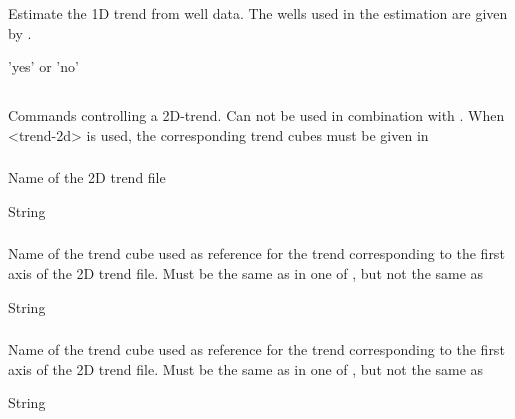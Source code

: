 {\subsubsection{}
 \slist
   \item \Description Estimate the 1D trend from well data. The wells used in the estimation are given by .
   \item \Argument 'yes' or 'no'
   \item \Default 
 \elist

\subsection{}
 \slist
   \item \Description Commands controlling a 2D-trend. Can not be used in combination with .  When <trend-2d> is used, the corresponding trend cubes must be given in 
   \item \Argument
   \item \Default 
 \elist

\subsubsection{}
 \slist
   \item \Description Name of the 2D trend file
   \item \Argument String
   \item \Default 
 \elist

\subsubsection{}
 \slist
   \item \Description Name of the trend cube used as reference for the trend corresponding to the first axis of the 2D trend file. Must be the same as  in one of , but not the same as 
   \item \Argument String
   \item \Default 
 \elist

\subsubsection{}
 \slist
   \item \Description  Name of the trend cube used as reference for the trend corresponding to the first axis of the 2D trend file. Must be the same as  in one of , but not the same as 
   \item \Argument String
   \item \Default 
 \elist

}
